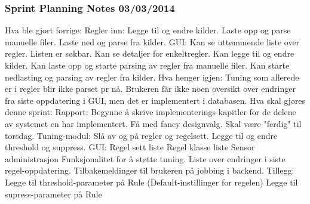 \subsubsection{Sprint Planning Notes 03/03/2014}

Hva ble gjort forrige:\newline
Regler inn:\newline
Legge til og endre kilder.\newline
Laste opp og parse manuelle filer.\newline
Laste ned og parse fra kilder.\newline
GUI:\newline
Kan se uttømmende liste over regler.\newline
Listen er søkbar.\newline
Kan se detaljer for enkeltregler.\newline
Kan legge til og endre kilder.\newline
Kan laste opp og starte parsing av regler fra manuelle filer.\newline
Kan starte nedlasting og parsing av regler fra kilder.\newline
Hva henger igjen:\newline
Tuning som allerede er i regler blir ikke parset pr nå.\newline
Brukeren får ikke noen oversikt over endringer fra siste oppdatering i GUI, men
det er implementert i databasen.\newline
Hva skal gjøres denne sprint:\newline
Rapport:\newline
Begynne å skrive implementerings-kapitler for de delene av systemet en har
implementert. \newline
Få med fancy designvalg. \newline
Skal være "ferdig" til torsdag.\newline
Tuning-modul:\newline
Slå av og på regler og regelsett.\newline
Legge til og endre threshold og suppress.\newline
GUI:\newline
Regel sett liste\newline
Regel klasse liste\newline
Sensor administrasjon\newline
Funksjonalitet for å støtte tuning.\newline
Liste over endringer i siste regel-oppdatering.\newline
Tilbakemeldinger til brukeren på jobbing i backend.\newline
Tillegg:\newline
Legge til threshold-parameter på Rule (Default-instillinger for regelen)\newline
Legge til supress-parameter på Rule\newline
